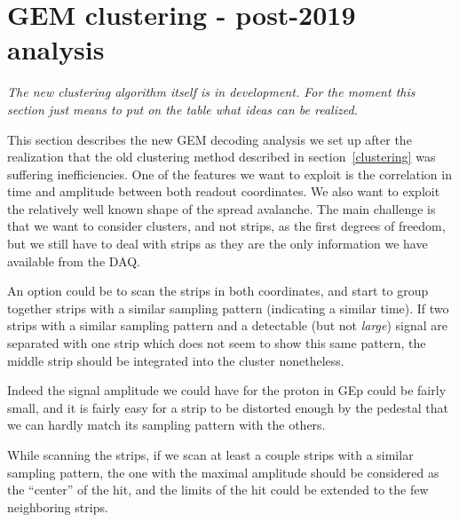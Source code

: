 \section{GEM clustering - post-2019 analysis}
\label{clustering_new}

{\em The new clustering algorithm itself is in development. For the moment this section just means to put on the table what ideas can be realized.}

This section describes the new GEM decoding analysis we set up after the realization that the old clustering method described in section~\ref{clustering} was suffering inefficiencies.
One of the features we want to exploit is the correlation in time and amplitude between both readout coordinates. We also want to exploit the relatively well known shape of the spread avalanche.
The main challenge is that we want to consider clusters, and not strips, as the first degrees of freedom, but we still have to deal with strips as they are the only information we have available from the DAQ.

An option could be to scan the strips in both coordinates, and start to group together strips with a similar sampling pattern (indicating a similar time). If two strips with a similar sampling pattern and a detectable (but not {\em large}) signal are separated with one strip which does not seem to show this same pattern, the middle strip should be integrated into the cluster nonetheless.

Indeed the signal amplitude we could have for the proton in GEp could be fairly small, and it is fairly easy for a strip to be distorted enough by the pedestal that we can hardly match its sampling pattern with the others.

While scanning the strips, if we scan at least a couple strips with a similar sampling pattern, the one with the maximal amplitude should be considered as the ``center'' of the hit, and the limits of the hit could be extended to the few neighboring strips.


%
%
%
%

